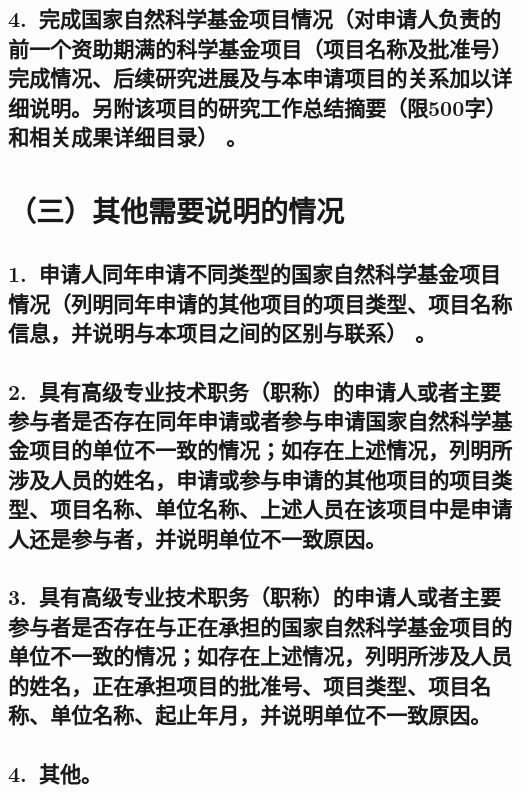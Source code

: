 \documentclass[12pt,UTF8,AutoFakeBold=2.5,a4paper]{ctexart} %
\begin{document}


\subsection{\hspace{1.45em}  4.~{\bfseries 完成国家自然科学基金项目情况}（对申请人负责的前一个资助期满的科学基金项目（项目名称及批准号）完成情况、后续研究进展及与本申请项目的关系加以详细说明。另附该项目的研究工作总结摘要（限500字）和相关成果详细目录）\hspace{-14pt} 。}




\section{{\bfseries （三）其他需要说明的情况}} %
\subsection{\hspace{1.45em}  1.~申请人同年申请不同类型的国家自然科学基金项目情况（列明同年申请的其他项目的项目类型、项目名称信息，并说明与本项目之间的区别与联系）\hspace{-14pt} 。}




\subsection{\hspace{1.45em}  2.~具有高级专业技术职务（职称）的申请人或者主要参与者是否存在同年申请或者参与申请国家自然科学基金项目的单位不一致的情况；如存在上述情况，列明所涉及人员的姓名，申请或参与申请的其他项目的项目类型、项目名称、单位名称、上述人员在该项目中是申请人还是参与者，并说明单位不一致原因。}



\subsection{\hspace{1.45em}  3.~具有高级专业技术职务（职称）的申请人或者主要参与者是否存在与正在承担的国家自然科学基金项目的单位不一致的情况；如存在上述情况，列明所涉及人员的姓名，正在承担项目的批准号、项目类型、项目名称、单位名称、起止年月，并说明单位不一致原因。\hspace{-16pt}}



\subsection{\hspace{1.45em}  4.~其他。}



\clearpage
\end{document}
